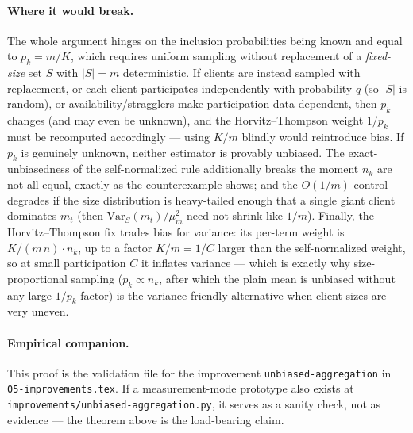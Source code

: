 \documentclass[11pt]{article}
\theoremstyle{definition}
\theoremstyle{remark}
\begin{document}
\paragraph{Where it would break.}
The whole argument hinges on the inclusion probabilities being known and equal to $p_k=m/K$, which requires uniform sampling without replacement of a \emph{fixed-size} set $S$ with $|S|=m$ deterministic. If clients are instead sampled with replacement, or each client participates independently with probability $q$ (so $|S|$ is random), or availability/stragglers make participation data-dependent, then $p_k$ changes (and may even be unknown), and the Horvitz--Thompson weight $1/p_k$ must be recomputed accordingly --- using $K/m$ blindly would reintroduce bias. If $p_k$ is genuinely unknown, neither estimator is provably unbiased. The exact-unbiasedness of the self-normalized rule additionally breaks the moment $n_k$ are not all equal, exactly as the counterexample shows; and the $O(1/m)$ control degrades if the size distribution is heavy-tailed enough that a single giant client dominates $m_t$ (then $\mathrm{Var}_S(m_t)/\mu_m^2$ need not shrink like $1/m$). Finally, the Horvitz--Thompson fix trades bias for variance: its per-term weight is $K/(m\,n)\cdot n_k$, up to a factor $K/m=1/C$ larger than the self-normalized weight, so at small participation $C$ it inflates variance --- which is exactly why size-proportional sampling ($p_k\propto n_k$, after which the plain mean is unbiased without any large $1/p_k$ factor) is the variance-friendly alternative when client sizes are very uneven.

\paragraph{Empirical companion.}
This proof is the validation file for the improvement \texttt{unbiased-aggregation} in \texttt{05-improvements.tex}. If a measurement-mode prototype also exists at \texttt{improvements/unbiased-aggregation.py}, it serves as a sanity check, not as evidence --- the theorem above is the load-bearing claim.
\end{document}

